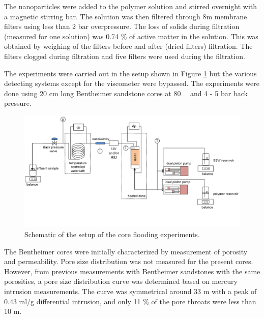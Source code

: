 \documentclass[journal = enfuem, manuscript =  article]{achemso}
\begin{document}
The nanoparticles were added to the polymer solution and stirred overnight with a magnetic stirring bar. The solution was then filtered through 8\micro m membrane filters using less than 2 bar overpressure. The loss of solids during filtration (measured for one solution) was 0.74 \% of active matter in the solution. This was obtained by weighing of the filters before and after (dried filters) filtration. The filters clogged during filtration and five filters were used during the filtration.

The experiments were carried out in the setup shown in Figure \ref{fig:experimentalSetup} but the various detecting systems except for the viscometer were bypassed. The experiments were done using 20 cm long Bentheimer sandstone cores at 80~\celsius~ and 4 - 5 bar back pressure.

\begin{figure}[]
        \includegraphics[width=\textwidth]{fig/experimentalSetup.png}
        \caption{Schematic of the setup of the core flooding experiments.}
        \label{fig:experimentalSetup}
\end{figure}

The Bentheimer cores were initially characterized by measurement of porosity and permeability. Pore size distribution was not measured for the present cores. However, from previous measurements with Bentheimer sandstones with the same porosities, a pore size distribution curve was determined based on mercury intrusion measurements. The curve was symmetrical around 33 \micro m with a peak of 0.43 ml/g differential intrusion, and only 11 \% of the pore throats were less than 10 \micro m.

\end{document}
